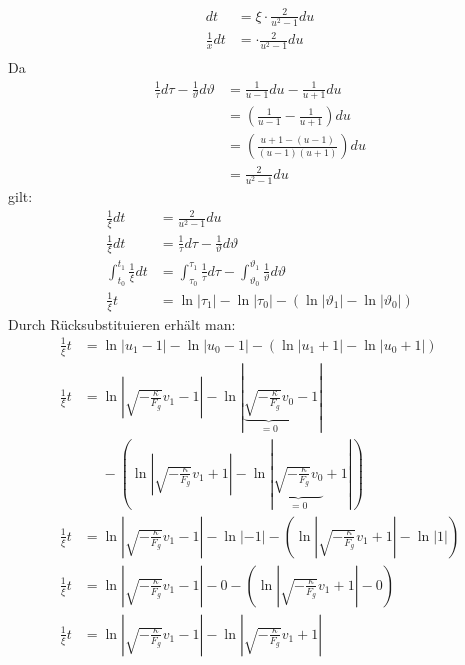 \documentclass[sectionformat = aufgabe]{gadsescript}
\begin{document}
\begin{enumerate}[label=\alph*)]
\begin{align*}
			dt &=  \xi \cdot \frac{2}{u^2 - 1} du\\
			\frac{1}{x}dt &=  \cdot \frac{2}{u^2 - 1} du\\
		\end{align*}
		Da
		\begin{align*}
			\frac{1}{\tau} d\tau - \frac{1}{\vartheta}d\vartheta &= \frac{1}{u - 1}du - \frac{1}{u + 1}du\\
			~&= \left(\frac{1}{u - 1} - \frac{1}{u + 1}\right)du\\
			~&= \left(\frac{u + 1  - (u - 1)}{(u - 1) (u + 1)}\right)du\\
			~&= \frac{2}{u^2 - 1}du
		\end{align*}
		gilt:
		\begin{align*}
			\frac{1}{\xi}dt &= \frac{2}{u^2 - 1} du\\
			\frac{1}{\xi}dt &= \frac{1}{\tau} d\tau - \frac{1}{\vartheta}d\vartheta\\
			\int_{t_0}^{t_1} \frac{1}{\xi}dt &= \int_{\tau_0}^{\tau_1} \frac{1}{\tau} d\tau - \int_{\vartheta_0}^{\vartheta_1} \frac{1}{\vartheta}d\vartheta\\
			\frac{1}{\xi} t &= \ln \left|\tau_1\right| - \ln \left|\tau_0\right| - \left( \ln \left|\vartheta_1\right| - \ln \left|\vartheta_0\right| \right)
		\end{align*}
		Durch Rücksubstituieren erhält man:
		\begin{align*}
			\frac{1}{\xi} t &= \ln \left|u_1 - 1\right| - \ln \left|u_0 - 1\right| - \left( \ln \left|u_1 + 1\right| - \ln |u_0 + 1| \right)\\
			\frac{1}{\xi} t &= \ln \left|\sqrt{-\frac{\kappa}{F_g}} v_1 - 1\right| - \ln \left|\underbrace{\sqrt{-\frac{\kappa}{F_g}} v_0}_{=0} - 1\right|\\
			~&\phantom{=} - \left( \ln \left|\sqrt{-\frac{\kappa}{F_g}} v_1 + 1\right| - \ln \left|\underbrace{\sqrt{-\frac{\kappa}{F_g}} v_0}_{=0} + 1\right| \right)\\
			\frac{1}{\xi} t &= \ln \left|\sqrt{-\frac{\kappa}{F_g}} v_1 - 1\right| - \ln \left|-1\right| - \left( \ln \left|\sqrt{-\frac{\kappa}{F_g}} v_1 + 1\right| - \ln \left|1\right| \right)\\
			\frac{1}{\xi} t &= \ln \left|\sqrt{-\frac{\kappa}{F_g}} v_1 - 1\right| - 0 - \left( \ln \left|\sqrt{-\frac{\kappa}{F_g}} v_1 + 1\right| - 0 \right)\\
			\frac{1}{\xi} t &= \ln \left|\sqrt{-\frac{\kappa}{F_g}} v_1 - 1\right|  - \ln \left|\sqrt{-\frac{\kappa}{F_g}} v_1 + 1\right|\\

\end{align*}
\end{enumerate}
\end{document}
